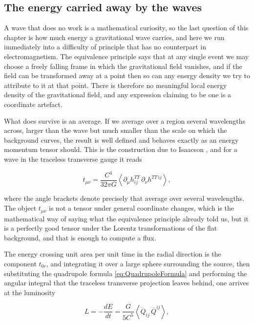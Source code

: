     \subsection{The energy carried away by the waves}

        A wave that does no work is a mathematical curiosity, so the last question of this chapter is how much energy a gravitational wave carries, and here we run immediately into a difficulty of principle that has no counterpart in electromagnetism. The equivalence principle says that at any single event we may choose a freely falling frame in which the gravitational field vanishes, and if the field can be transformed away at a point then so can any energy density we try to attribute to it at that point. There is therefore no meaningful local energy density of the gravitational field, and any expression claiming to be one is a coordinate artefact.

        What does survive is an average. If we average over a region several wavelengths across, larger than the wave but much smaller than the scale on which the background curves, the result is well defined and behaves exactly as an energy momentum tensor should. This is the construction due to Isaacson \citep{isaacson1968}, and for a wave in the traceless transverse gauge it reads

        \begin{equation}\label{eq:Isaacson}
            t_{\mu\nu} = \frac{C^4}{32\pi G}\left\langle \partial_{\mu}h^{TT}_{ij}\,\partial_{\nu}h^{TT\,ij}\right\rangle,
        \end{equation}

        where the angle brackets denote precisely that average over several wavelengths. The object $t_{\mu\nu}$ is not a tensor under general coordinate changes, which is the mathematical way of saying what the equivalence principle already told us, but it is a perfectly good tensor under the Lorentz transformations of the flat background, and that is enough to compute a flux.

        The energy crossing unit area per unit time in the radial direction is the component $t_{0r}$, and integrating it over a large sphere surrounding the source, then substituting the quadrupole formula \ref{eq:QuadrupoleFormula} and performing the angular integral that the traceless transverse projection leaves behind, one arrives at the luminosity

        \begin{equation}\label{eq:QuadrupoleLuminosity}
            L = -\frac{dE}{dt} = \frac{G}{5C^5}\left\langle \dddot{Q}_{ij}\,\dddot{Q}^{ij}\right\rangle,
        \end{equation}

